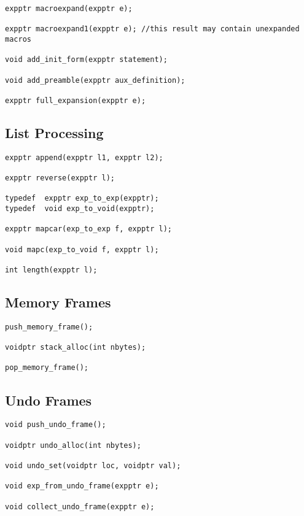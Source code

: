 \documentclass{article}
\begin{document}
\begin{verbatim}
expptr macroexpand(expptr e);

expptr macroexpand1(expptr e); //this result may contain unexpanded macros

void add_init_form(expptr statement);

void add_preamble(expptr aux_definition);

expptr full_expansion(expptr e);
\end{verbatim}

\subsection{List Processing}

\begin{verbatim}
expptr append(expptr l1, expptr l2);

expptr reverse(expptr l);

typedef  expptr exp_to_exp(expptr);
typedef  void exp_to_void(expptr);

expptr mapcar(exp_to_exp f, expptr l);

void mapc(exp_to_void f, expptr l);

int length(expptr l);
\end{verbatim}

\subsection{Memory Frames}

\begin{verbatim}
push_memory_frame();

voidptr stack_alloc(int nbytes);

pop_memory_frame();
\end{verbatim}

\subsection{Undo Frames}

\begin{verbatim}
void push_undo_frame();

voidptr undo_alloc(int nbytes);

void undo_set(voidptr loc, voidptr val);

void exp_from_undo_frame(expptr e);

void collect_undo_frame(expptr e);
\end{verbatim}




\end{document}
